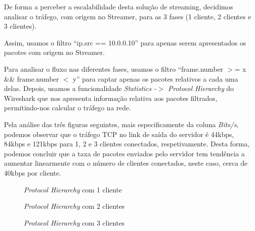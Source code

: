 \documentclass[a4paper, 11pt]{article}
\begin{document}
De forma a perceber a escalabilidade desta solução de streaming, decidimos analisar o tráfego, com origem no Streamer, para as 3 fases (1 cliente, 2 clientes e 3 clientes).

Assim, usamos o filtro ``ip.src == 10.0.0.10'' para apenas serem apresentados os pacotes com origem no Streamer.

Para analisar o fluxo nas diferentes fases, usamos o filtro ``frame.number $>$= x \&\& frame.number $<$ y'' para captar apenas os pacotes relativos a cada uma delas. Depois, usamos a funcionalidade \textit{Statistics -$>$ Protocol Hierarchy} do Wireshark que nos apresenta informação relativa aos pacotes filtrados, permitindo-nos calcular o tráfego na rede.

Pela análise das três figuras seguintes, mais especificamente da coluna \textit{Bits/s}, podemos observar que o tráfego TCP no link de saída do servidor é 44kbps, 84kbps e 121kbps para 1, 2 e 3 clientes conectados, respetivamente. Desta forma, podemos concluir que a taxa de pacotes enviados pelo servidor tem tendência a aumentar linearmente com o número de clientes conectados, neste caso, cerca de 40kbps por cliente.

\begin{figure}[H]
    \centering
    \caption{\textit{Protocol Hierarchy} com 1 cliente}
\end{figure}

\begin{figure}[H]
    \centering
    \caption{\textit{Protocol Hierarchy} com 2 clientes}
\end{figure}

\begin{figure}[H]
    \centering
    \caption{\textit{Protocol Hierarchy} com 3 clientes}
\end{figure}
\end{document}
